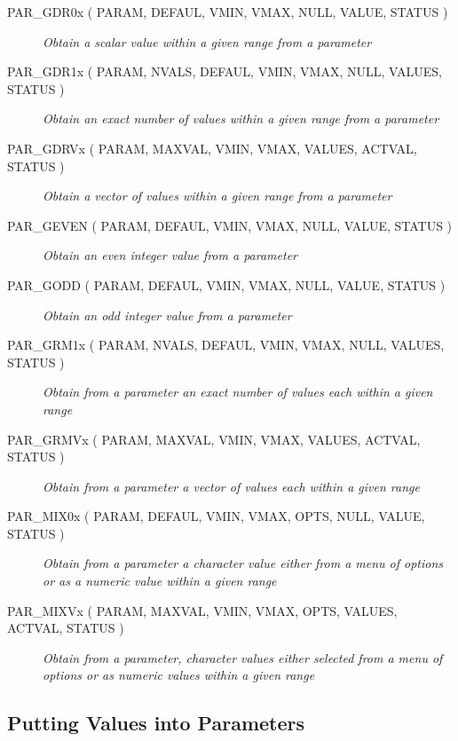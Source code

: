 \documentclass[twoside,11pt]{article}
\newcommand{\htmlref}[2]{#1}
\newcommand{\xlabel}[1]{}
\newcommand{\listline}{\hspace{1pt}\\}
\newcommand{\listova}[1]{}
\newcommand{\listovb}[1]{\textbf{#1}\\}
\renewcommand{\listline}{}
\renewcommand{\listova}[1]{#1}
\renewcommand{\listovb}[1]{}
\begin{document}
\begin{description}
\item [\htmlref{PAR\_GDR0x}{PAR_GDR0x} 
( PARAM, DEFAUL, VMIN, VMAX, NULL, VALUE, STATUS )] \listline
\textit{Obtain a scalar value within a given range from a parameter}
\item [\htmlref{PAR\_GDR1x}{PAR_GDR1x} 
( PARAM, NVALS, DEFAUL, VMIN, VMAX, NULL, VALUES, \listova{STATUS )}] \listline
\listovb{STATUS )}
\textit{Obtain an exact number of values within a given range from a parameter}
\item [\htmlref{PAR\_GDRVx}{PAR_GDRVx} 
( PARAM, MAXVAL, VMIN, VMAX, VALUES, ACTVAL, STATUS )] \listline
\textit{Obtain a vector of values within a given range from a parameter}
\item [\htmlref{PAR\_GEVEN}{PAR_GEVEN} 
( PARAM, DEFAUL, VMIN, VMAX, NULL, VALUE, STATUS )] \listline
\textit{Obtain an even integer value from a parameter}
\item [\htmlref{PAR\_GODD}{PAR_GODD} 
( PARAM, DEFAUL, VMIN, VMAX, NULL, VALUE, STATUS )] \listline
\textit{Obtain an odd integer value from a parameter}
\item [\htmlref{PAR\_GRM1x}{PAR_GRM1x} 
( PARAM, NVALS, DEFAUL, VMIN, VMAX, NULL, VALUES, \listova{STATUS )}] \listline
\listovb{STATUS )}
\textit{Obtain from a parameter an exact number of values each within a
             given range}
\item [\htmlref{PAR\_GRMVx}{PAR_GRMVx} 
( PARAM, MAXVAL, VMIN, VMAX, VALUES, ACTVAL, STATUS )] \listline
\textit{Obtain from a parameter a vector of values each within a given
             range}
\item [\htmlref{PAR\_MIX0x}{PAR_MIX0x} 
( PARAM, DEFAUL, VMIN, VMAX, OPTS, NULL, VALUE, STATUS )] \listline
\textit{Obtain from a parameter a character value either from a menu of
             options or as a numeric value within a given range}
\item [\htmlref{PAR\_MIXVx}{PAR_MIXVx} 
( PARAM, MAXVAL, VMIN, VMAX, OPTS, VALUES, ACTVAL, \listova{STATUS )}] \listline
\listovb{STATUS )}
\textit{Obtain from a parameter, character values either selected from a
             menu of options or as numeric values within a given range}
\end{description}


\subsection{\xlabel{putting_values_into_parameters}Putting Values into Parameters}
\end{document}
